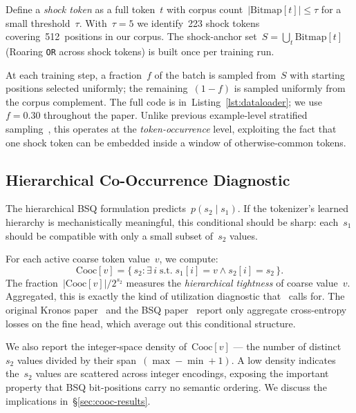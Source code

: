 \documentclass[10pt]{article}
\begin{document}
Define a \emph{shock token} as a full token~$t$ with corpus
count~$|\mathrm{Bitmap}[t]| \leq \tau$ for a small
threshold~$\tau$. With~$\tau=5$ we identify~223 shock tokens
covering~512~positions in our corpus. The shock-anchor
set~$S = \bigcup_t \mathrm{Bitmap}[t]$ (Roaring \texttt{OR} across
shock tokens) is built once per training run.

At each training step, a fraction~$f$ of the batch is sampled from~$S$
with starting positions selected uniformly; the remaining~$(1-f)$ is
sampled uniformly from the corpus complement. The full code is
in~Listing~\ref{lst:dataloader}; we use~$f=0.30$ throughout the
paper. Unlike previous example-level stratified
sampling~\citep{sohem2017, curriculum_llm2025}, this operates at the
\emph{token-occurrence} level, exploiting the fact that one shock
token can be embedded inside a window of otherwise-common tokens.

\subsection{Hierarchical Co-Occurrence
Diagnostic}\label{sec:diagnostic}

The hierarchical BSQ formulation predicts~$p(s_2 \mid s_1)$. If the
tokenizer's learned hierarchy is mechanistically meaningful, this
conditional should be sharp: each~$s_1$ should be compatible with
only a small subset of~$s_2$ values.

For each active coarse token value~$v$, we compute:
\begin{equation}
\mathrm{Cooc}[v] = \{\, s_2 : \exists\, i\;\text{s.t.}\;s_1[i]=v
\land s_2[i]=s_2 \,\}.
\end{equation}
The fraction~$|\mathrm{Cooc}[v]| / 2^{s_2}$ measures the
\emph{hierarchical tightness} of coarse value~$v$. Aggregated, this
is exactly the kind of utilization diagnostic
that~\citet{shrinks_codebook2026} calls for. The original Kronos
paper~\citep{kronos2025} and the BSQ paper~\citep{bsq2024} report only
aggregate cross-entropy losses on the fine head, which average out
this conditional structure.

We also report the integer-space density of~$\mathrm{Cooc}[v]$ --- the
number of distinct~$s_2$ values divided by their
span~$(\max - \min + 1)$. A low density indicates the~$s_2$ values
are scattered across integer encodings, exposing the important
property that BSQ bit-positions carry no semantic ordering. We
discuss the implications in~\S\ref{sec:cooc-results}.
\end{document}
